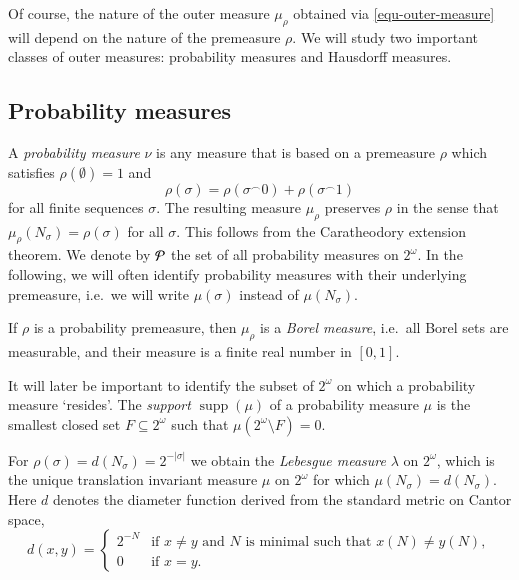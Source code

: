 \documentclass[11pt,reqno]{article}
\theoremstyle{plain}
\theoremstyle{definition}
\theoremstyle{remark}
\numberwithin{equation}{section}
\newcommand{\Cant}{\ensuremath{2^{\omega}}}
\newcommand{\Cyl}[1]{\ensuremath{N_{#1}}}
\newcommand{\Conc}{\ensuremath{\mbox{}^\frown}}
\newcommand{\Pmeas}{\ensuremath{\CMcal{P}}}
\newcommand{\Leb}{\ensuremath{\lambda}}
\begin{document}
Of course, the nature of the outer measure $\mu_\rho$ obtained via \eqref{equ-outer-measure} will depend on the nature of the premeasure $\rho$. We will study two important classes of outer measures: probability measures and Hausdorff measures. 



%
%
\subsection{Probability measures}

A \emph{probability measure} $\nu$ is any measure that is based on a premeasure $\rho$ which satisfies $\rho(\emptyset) = 1$ and
\begin{equation} \label{equ-probability measure}
	\rho(\sigma) = \rho(\sigma \Conc 0) + \rho(\sigma \Conc 1)
\end{equation}
for all finite sequences $\sigma$. The resulting measure $\mu_\rho$ preserves $\rho$ in the sense that $\mu_\rho(N_\sigma) = \rho(\sigma)$ for all $\sigma$. This follows from the Caratheodory extension theorem. We denote by $\Pmeas$ the set of all probability measures on $\Cant$. In the following, we will often identify probability measures with their underlying premeasure, i.e.\ we will write $\mu(\sigma)$ instead of $\mu(\Cyl{\sigma})$.

If $\rho$ is a probability premeasure, then $\mu_\rho$ is a \emph{Borel measure}, i.e.\ all Borel sets are measurable, and their measure is a finite real number in $[0,1]$. 

It will later be important to identify the subset of $\Cant$ on which a probability measure `resides'. The \emph{support} $\operatorname{supp}(\mu)$ of a probability measure $\mu$ is the smallest closed set $F \subseteq \Cant$ such that $\mu(\Cant\setminus F) = 0$.

\medskip
For $\rho(\sigma) = d(\Cyl{\sigma}) = 2^{-|\sigma|}$ we obtain the \emph{Lebesgue measure} $\Leb$ on $\Cant$, which is the unique translation invariant measure $\mu$ on $\Cant$ for which $\mu(\Cyl{\sigma}) = d(\Cyl{\sigma})$. Here $d$ denotes the diameter function derived from the standard metric on Cantor space,
\[
	d(x,y) = \begin{cases}
		2^{-N} & \text{if $x \neq y$ and $N$ is minimal such that $x(N) \neq y(N)$}, \\
		0 & \text{if $x=y$}.
	\end{cases}
\]
\end{document}
